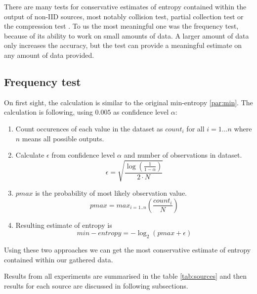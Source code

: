 \documentclass[
  print, %
  Table,   %
  nolof,     %
  nolot,     %
           oneside
]{fithesis3}
\begin{document}
There are many tests for conservative estimates of entropy contained within the output of non-IID sources, most notably collision test, partial collection test or the compression test \cite{barker2012recommendation}. To us the most meaningful one was the frequency test\cite{barker2012recommendation}, because of its ability to work on small amounts of data. A larger amount of data only increases the accuracy, but the test can provide a meaningful estimate on any amount of data provided.

\subsection{Frequency test}\label{par:freq}
  On first sight, the calculation is similar to the original min-entropy \ref{par:min}. The calculation is following, using $0.005$ as confidence level $\alpha$:

  \begin{enumerate}
    \item Count occurences of each value in the dataset as $count_i$ for all $i=1 \dots n$ where $n$ means all possible outputs.
    \item Calculate $\epsilon$ from confidence level $\alpha$ and number of observations in dataset.
    $$\epsilon = \sqrt{\frac{\log(\frac{1}{1-\alpha})}{2\cdot N}}$$
    \item $pmax$ is the probability of most likely observation value.
    $$pmax = max_{i=1..n}(\frac{count_i}{N})$$
    \item Resulting estimate of entropy is
    $$min-entropy =  -\log_2 (pmax + \epsilon)$$

  \end{enumerate}

  Using these two approaches we can get the most conservative estimate of entropy contained within our gathered data.

  Results from all experiments are summarised in the table \ref{tab:sources} and then results for each source are discussed in following subsections.
\end{document}
